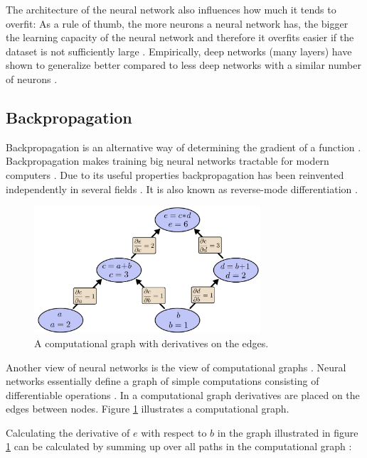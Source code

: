 \documentclass[draft,final,oneside]{vutinfth} %
\begin{document}
The architecture of the neural network also influences how much it tends to overfit: As a rule of thumb, the more neurons a neural network has, the bigger the learning capacity of the neural network and therefore it overfits easier if the dataset is not sufficiently large \cite{Goodfellow-et-al-2016}. Empirically, deep networks (many layers) have shown to generalize better compared to less deep networks with a similar number of neurons \cite{Goodfellow-et-al-2016}.

\subsection{Backpropagation} \label{backprop}

Backpropagation is an alternative way of determining the gradient of a function \cite{Goodfellow-et-al-2016}. Backpropagation makes training big neural networks tractable for modern computers \cite{bishop}. Due to its useful properties backpropagation has been reinvented independently in several fields \cite{Griewank2012WhoIT}. It is also known as reverse-mode differentiation \cite{colahbackprop}.

\begin{figure}[ht]
	\centering
  	\includegraphics[width=0.75\textwidth]{graphics/computationgraph.png}
	\caption{A computational graph with derivatives on the edges. \cite{colahbackprop}}
	\label{fig:computationgraph}
\end{figure}


Another view of neural networks is the view of computational graphs \cite{Goodfellow-et-al-2016}. Neural networks essentially define a graph of simple computations consisting of differentiable operations \cite{Goodfellow-et-al-2016}. In a computational graph derivatives are placed on the edges between nodes. Figure \ref{fig:computationgraph} illustrates a computational graph.

Calculating the derivative of $e$ with respect to $b$ in the graph illustrated in figure \ref{fig:computationgraph} can be calculated by summing up over all paths in the computational graph \cite{colahbackprop}:
\end{document}
